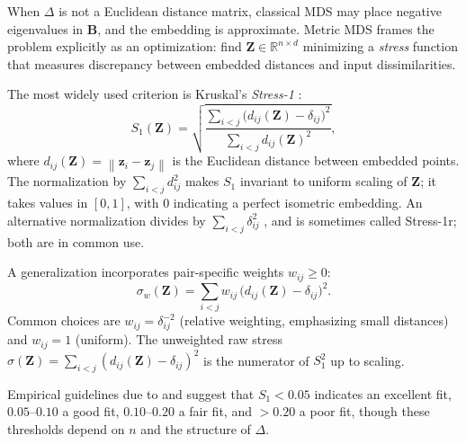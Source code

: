 \documentclass[11pt]{article}
\newcommand{\R}{\mathbb{R}}
\newcommand{\bz}{\mathbf{z}}
\newcommand{\bZ}{\mathbf{Z}}
\newcommand{\bB}{\mathbf{B}}
\newcommand{\norm}[1]{\left\|#1\right\|}
\newcommand{\StressOne}{S_1}
\begin{document}
When $\Delta$ is not a Euclidean distance matrix, classical MDS may place
negative eigenvalues in $\bB$, and the embedding is approximate.  Metric
MDS \citep{kruskal1964multidimensional} frames the problem explicitly as
an optimization: find $\bZ \in \R^{n \times d}$ minimizing a \emph{stress}
function that measures discrepancy between embedded distances and input
dissimilarities.

The most widely used criterion is Kruskal's \emph{Stress-1}
\citep{kruskal1964multidimensional}:
\begin{equation}
  \StressOne(\bZ) = \sqrt{
    \frac{\displaystyle\sum_{i < j}
          \bigl(d_{ij}(\bZ) - \delta_{ij}\bigr)^2}
         {\displaystyle\sum_{i < j} d_{ij}(\bZ)^2}
  },
  \label{eq:stress1}
\end{equation}
where $d_{ij}(\bZ) = \norm{\bz_i - \bz_j}$ is the Euclidean distance
between embedded points.  The normalization by $\sum_{i<j} d_{ij}^2$
makes $\StressOne$ invariant to uniform scaling of $\bZ$; it takes values
in $[0, 1]$, with 0 indicating a perfect isometric embedding.  An
alternative normalization divides by $\sum_{i<j} \delta_{ij}^2$
\citep{borg2005modern}, and is sometimes called Stress-1r; both are in
common use.

A generalization incorporates pair-specific weights $w_{ij} \geq 0$:
\begin{equation}
  \sigma_w(\bZ)
  = \sum_{i < j} w_{ij}\,\bigl(d_{ij}(\bZ) - \delta_{ij}\bigr)^2.
  \label{eq:weighted_stress}
\end{equation}
Common choices are $w_{ij} = \delta_{ij}^{-2}$ (relative weighting,
emphasizing small distances) and $w_{ij} = 1$ (uniform).  The unweighted
raw stress $\sigma(\bZ) = \sum_{i<j}(d_{ij}(\bZ) - \delta_{ij})^2$
is the numerator of $\StressOne^2$ up to scaling.

Empirical guidelines due to \citet{kruskal1964nonmetric} and
\citet{borg2005modern} suggest that $\StressOne < 0.05$ indicates an
excellent fit, $0.05$--$0.10$ a good fit, $0.10$--$0.20$ a fair fit, and
$> 0.20$ a poor fit, though these thresholds depend on $n$ and the
structure of $\Delta$.
\end{document}
